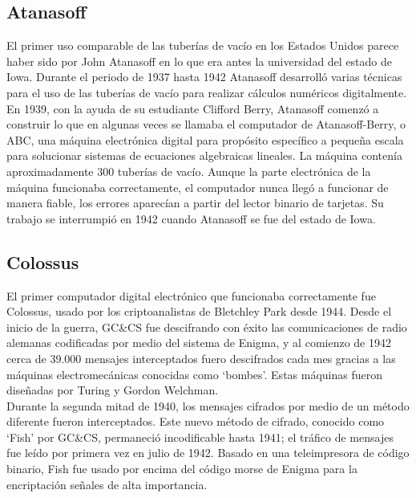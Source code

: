 \documentclass[a4paper]{article}
\begin{document}
    \subsection*{Atanasoff}

    El primer uso comparable de las tuberías de vacío en los Estados Unidos parece haber sido por John Atanasoff en lo que era antes la universidad del estado de Iowa. Durante el periodo de 1937 hasta 1942 Atanasoff desarrolló varias técnicas para el uso de las tuberías de vacío para realizar cálculos numéricos digitalmente. En 1939, con la ayuda de su estudiante Clifford Berry, Atanasoff comenzó a construir lo que en algunas veces se llamaba el computador de Atanasoff-Berry, o ABC, una máquina electrónica digital para propósito específico a pequeña escala para solucionar sistemas de ecuaciones algebraicas lineales. La máquina contenía aproximadamente 300 tuberías de vacío. Aunque la parte electrónica  de la máquina funcionaba correctamente, el computador nunca llegó a funcionar de manera fiable, los errores aparecían a partir del lector binario de tarjetas. Su trabajo se interrumpió en 1942 cuando Atanasoff se fue del estado de Iowa.

    \subsection*{Colossus}

    El primer computador digital electrónico que funcionaba correctamente fue Colossus, usado por los criptoanalistas de Bletchley Park desde 1944. Desde el inicio de la guerra, GC\&CS fue descifrando con éxito las comunicaciones de radio alemanas codificadas por medio del sistema de Enigma, y al comienzo de 1942 cerca de 39.000 mensajes interceptados fuero descifrados cada mes gracias a las máquinas electromecánicas conocidas como ‘bombes’. Estas máquinas fueron diseñadas por Turing y Gordon Welchman.\\

    Durante la segunda mitad de 1940, los mensajes cifrados por medio de un método diferente fueron interceptados. Este nuevo método de cifrado, conocido como ‘Fish’ por GC\&CS, permaneció incodificable hasta 1941; el tráfico de mensajes fue leído por primera vez en julio de 1942. Basado en una teleimpresora de código binario, Fish fue usado por encima del código morse de Enigma para la encriptación señales de alta importancia.\\
\end{document}
